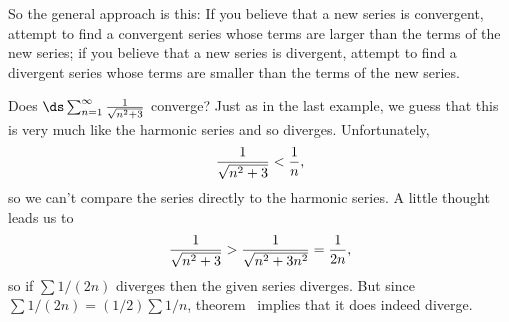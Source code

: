 So the general approach is this: If you believe that a new series is
convergent, attempt to find a convergent series whose terms are
larger than the terms of the new series; if you believe that a new
series is divergent, attempt to find a divergent series whose terms
are smaller than the terms of the new series.

\begin{example} Does $\ds\sum_{n=1}^\infty {1\over\sqrt{n^2+3}}$ converge?
\ssk
Just as in the last example, we guess that this is very much like the
harmonic series and so diverges. Unfortunately,
$${1\over\sqrt{n^2+3}} < {1\over n},$$
so we can't compare the series directly to the harmonic series.
A little thought leads us to
$${1\over\sqrt{n^2+3}} > {1\over\sqrt{n^2+3n^2}} = {1\over2n},$$ so if
$\sum 1/(2n)$ diverges then the given series diverges. But since $\sum
1/(2n)=(1/2)\sum 1/n$, theorem~ implies
that it does indeed diverge.
\end{example}





